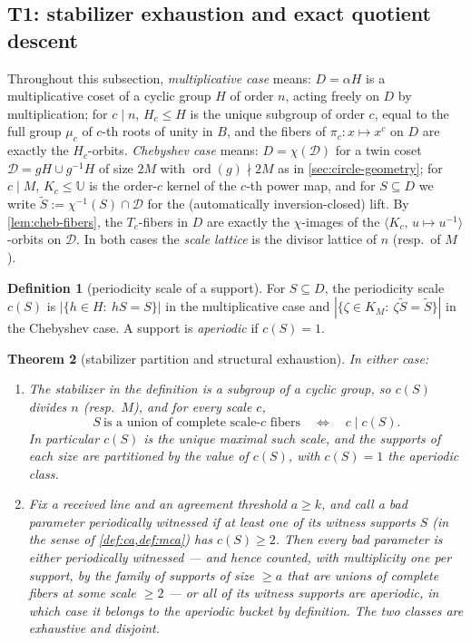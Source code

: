 \documentclass[11pt]{article}
\newtheorem{theorem}{Theorem}[section]
\theoremstyle{definition}
\newtheorem{definition}[theorem]{Definition}
\theoremstyle{remark}
\newcommand{\B}{B}
\newcommand{\UU}{\mathbb{U}}
\begin{document}
\subsection{T1: stabilizer exhaustion and exact quotient descent}\label{sec:discharge-T1}

Throughout this subsection, \emph{multiplicative case} means: $D=\alpha H$ is a multiplicative coset of a cyclic group $H$ of order $n$, acting freely on $D$ by multiplication; for $c\mid n$, $H_c\le H$ is the unique subgroup of order $c$, equal to the full group $\mu_c$ of $c$-th roots of unity in $\B$, and the fibers of $\pi_c:x\mapsto x^c$ on $D$ are exactly the $H_c$-orbits. \emph{Chebyshev case} means: $D=\chi(\mathcal D)$ for a twin coset $\mathcal D=gH\cup g^{-1}H$ of size $2M$ with $\operatorname{ord}(g)\nmid2M$ as in \cref{sec:circle-geometry}; for $c\mid M$, $K_c\le\UU$ is the order-$c$ kernel of the $c$-th power map, and for $S\subseteq D$ we write $\widetilde S:=\chi^{-1}(S)\cap\mathcal D$ for the (automatically inversion-closed) lift. By \cref{lem:cheb-fibers}, the $T_c$-fibers in $D$ are exactly the $\chi$-images of the $\langle K_c,\,u\mapsto u^{-1}\rangle$-orbits on $\mathcal D$. In both cases the \emph{scale lattice} is the divisor lattice of $n$ (resp.\ of $M$).

\begin{definition}[periodicity scale of a support]\label{def:periodicity-scale}
For $S\subseteq D$, the periodicity scale $c(S)$ is $|\{h\in H:\ hS=S\}|$ in the multiplicative case and $|\{\zeta\in K_M:\ \zeta\widetilde S=\widetilde S\}|$ in the Chebyshev case. A support is \emph{aperiodic} if $c(S)=1$.
\end{definition}

\begin{theorem}[stabilizer partition and structural exhaustion]\label{thm:stabilizer-partition}
In either case:
\begin{enumerate}[label=\textup{(\roman*)}]
\item The stabilizer in the definition is a subgroup of a cyclic group, so $c(S)$ divides $n$ \textup(resp.\ $M$\textup), and for every scale $c$,
\[
S\ \text{is a union of complete scale-$c$ fibers}
\quad\Longleftrightarrow\quad
c\mid c(S).
\]
In particular $c(S)$ is the unique maximal such scale, and the supports of each size are partitioned by the value of $c(S)$, with $c(S)=1$ the aperiodic class.
\item Fix a received line and an agreement threshold $a\ge k$, and call a bad parameter \emph{periodically witnessed} if at least one of its witness supports $S$ \textup(in the sense of \cref{def:ca,def:mca}\textup) has $c(S)\ge2$. Then every bad parameter is either periodically witnessed --- and hence counted, with multiplicity one per support, by the family of supports of size $\ge a$ that are unions of complete fibers at some scale $\ge2$ --- or all of its witness supports are aperiodic, in which case it belongs to the aperiodic bucket by definition. The two classes are exhaustive and disjoint.
\end{enumerate}
\end{theorem}
\end{document}
